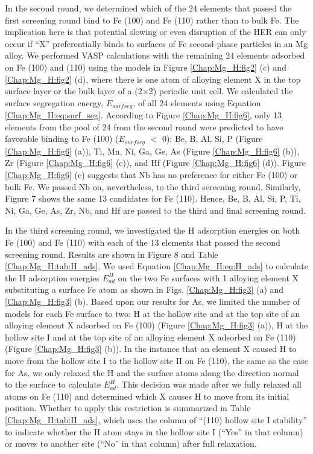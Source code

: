 In the second round, we determined which of the 24 elements that passed the first screening round bind to Fe (100) and Fe (110) rather than to bulk Fe. The implication here is that potential slowing or even disruption of the HER can only occur if ``X'' preferentially binds to surfaces of Fe second-phase particles in an Mg alloy. We performed \ac{VASP} calculations with the remaining 24 elements adsorbed on Fe (100) and (110) using the models in Figure \ref{Chap:Mg_H:fig2} (c) and \ref{Chap:Mg_H:fig2} (d), where there is one atom of alloying element X in the top surface layer or the bulk layer of a (2$\times$2) periodic unit cell. We calculated the surface segregation energy, $E_{surf seg}$, of all 24 elements using Equation \ref{Chap:Mg_H:eq:surf_seg}. According to Figure \ref{Chap:Mg_H:fig6}, only 13 elements from the pool of 24 from the second round were predicted to have favorable binding to Fe (100) ($E_{surf seg}$ $<$ 0): Be, B, Al, Si, P (Figure \ref{Chap:Mg_H:fig6} (a)), Ti, Mn, Ni, Ga, Ge, As (Figure \ref{Chap:Mg_H:fig6} (b)), Zr (Figure \ref{Chap:Mg_H:fig6} (c)), and Hf (Figure \ref{Chap:Mg_H:fig6} (d)). Figure \ref{Chap:Mg_H:fig6} (c) suggests that Nb has no preference for either Fe (100) or bulk Fe. We passed Nb on, nevertheless, to the third screening round. Similarly, Figure 7 shows the same 13 candidates for Fe (110).  Hence, Be, B, Al, Si, P, Ti, Ni, Ga, Ge, As, Zr, Nb, and Hf are passed to the third and final screening round.





In the third screening round, we investigated the H adsorption energies on both Fe (100) and Fe (110) with each of the 13 elements that passed the second screening round. Results are shown in Figure 8 and Table \ref{Chap:Mg_H:tab:H_ads}. We used Equation \ref{Chap:Mg_H:eq:H_ads} to calculate the H adsorption energies $E_{ad}^H$ on the two Fe surfaces with 1 alloying element X substituting a surface Fe atom as shown in Figs. \ref{Chap:Mg_H:fig3} (a) and \ref{Chap:Mg_H:fig3} (b). Based upon our results for As, we limited the number of models for each Fe surface to two: H at the hollow site and at the top site of an alloying element X adsorbed on Fe (100) (Figure \ref{Chap:Mg_H:fig3} (a)), H at the hollow site I and at the top site of an alloying element X adsorbed on Fe (110) (Figure \ref{Chap:Mg_H:fig3} (b)). In the instance that an element X caused H to move from the hollow site I to the hollow site II on Fe (110), the same as the case for As, we only relaxed the H and the surface atoms along the direction normal to the surface to calculate $E_{ad}^H$. This decision was made after we fully relaxed all atoms on Fe (110) and determined which X causes H to move from its initial position. Whether to apply this restriction is summarized in Table \ref{Chap:Mg_H:tab:H_ads}, which uses the column of ``(110) hollow site I stability'' to indicate whether the H atom stays in the hollow site I (``Yes'' in that column) or moves to another site (``No'' in that column) after full relaxation.


